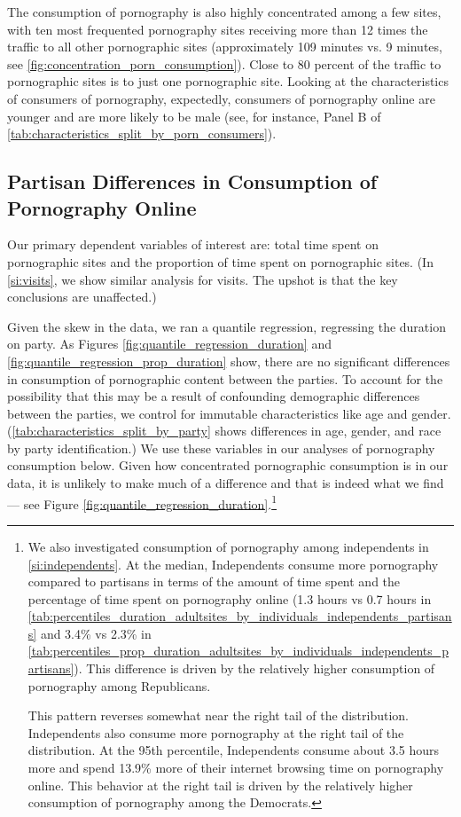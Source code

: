 \documentclass[12pt, letterpaper]{article}
\begin{document}
The consumption of pornography is also highly concentrated among a few sites, with ten most frequented pornography sites receiving more than 12 times the traffic to all other pornographic sites  (approximately 109 minutes vs. 9 minutes, see \cref{fig:concentration_porn_consumption}). Close to 80 percent of the traffic to pornographic sites is to just one pornographic site. Looking at the characteristics of consumers of pornography, expectedly, consumers of pornography online are younger and are more likely to be male (see, for instance, Panel B of \cref{tab:characteristics_split_by_porn_consumers}).

\subsection*{Partisan Differences in Consumption of Pornography Online}
Our primary dependent variables of interest are: total time spent on pornographic sites and the proportion of time spent on pornographic sites. (In \ref{si:visits}, we show similar analysis for visits. The upshot is that the key conclusions are unaffected.)

Given the skew in the data, we ran a quantile regression, regressing the duration on party. As Figures \ref{fig:quantile_regression_duration} and \ref{fig:quantile_regression_prop_duration} show, there are no significant differences in consumption of pornographic content between the parties. To account for the possibility that this may be a result of confounding demographic differences between the parties, we control for immutable characteristics like age and gender. (\cref{tab:characteristics_split_by_party} shows differences in age, gender, and race by party identification.) We use these variables in our analyses of pornography consumption below. Given how concentrated pornographic consumption is in our data, it is unlikely to make much of a difference and that is indeed what we find --- see Figure \ref{fig:quantile_regression_duration}.\footnote{
	We also investigated consumption of pornography among independents in \cref{si:independents}.
	At the median, Independents consume more pornography compared to partisans in terms of the amount of time spent and the percentage of time spent on pornography online (1.3 hours vs 0.7 hours in \cref{tab:percentiles_duration_adultsites_by_individuals_independents_partisans} and 3.4\% vs 2.3\% in \cref{tab:percentiles_prop_duration_adultsites_by_individuals_independents_partisans}).
	This difference is driven by the relatively higher consumption of pornography among Republicans.
	
	This pattern reverses somewhat near the right tail  of the distribution.
	Independents also consume more pornography at the right tail of the distribution. 
	At the 95th percentile, Independents consume about 3.5 hours more and spend 13.9\% more of their internet browsing time on pornography online.
	This behavior at the right tail is driven by the relatively higher consumption of pornography among the Democrats.
}
\end{document}
